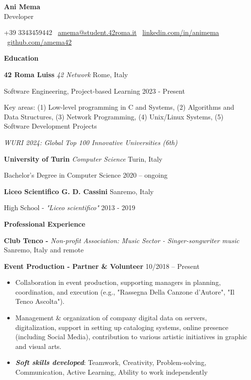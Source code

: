 \documentclass[11pt]{article}
\begin{document}
\begin{center}
    \textbf{Ani Mema}\\ 
    Developer
\end{center}

\begin{center}
    +39 3343459442 \textbullet \ \href{mailto:amema@student.42roma.it}{amema@student.42roma.it} \textbullet \ \href{https://www.linkedin.com/in/animema/}{linkedin.com/in/animema} \textbullet \ \href{https://github.com/amema42}{github.com/amema42}
\end{center}

\begin{center}
    \textbf{Education}
\end{center}
\textbf{42 Roma Luiss} \textit{42 Network} \hfill Rome, Italy

Software Engineering, Project-based Learning \hfill 2023 - Present

Key areas: (1) Low-level programming in C and Systems, (2) Algorithms and Data Structures, (3) Network Programming, (4) Unix/Linux Systems, (5) Software Development Projects

\textit{WURI 2024: Global Top 100 Innovative Universities (6th)
}
\vspace{12pt}

\textbf{University of Turin} \textit{Computer Science} \hfill Turin, Italy

Bachelor's Degree in Computer Science \hfill	2020 – ongoing

\vspace{12pt}

\textbf{Liceo Scientifico G. D. Cassini} \hfill	Sanremo, Italy

High School - \textit{"Liceo scientifico"} \hfill 2013 - 2019

\vspace{12pt}

\begin{center}
    \textbf{Professional Experience}
\end{center}
\textbf{Club Tenco -} \textit{Non-profit Association: Music Sector - Singer-songwriter music} \hfill Sanremo, Italy and remote

\textbf{Event Production - Partner \& Volunteer} \hfill 10/2018 – Present

\begin{itemize}[noitemsep, topsep=0pt, partopsep=0pt, parsep=0pt]
    \item Collaboration in event production, supporting managers in planning, coordination, and execution (e.g., "Rassegna Della Canzone d'Autore", "Il Tenco Ascolta").
    \item Management \& organization of company digital data on servers, digitalization, support in setting up cataloging systems, online presence (including Social Media), contribution to various artistic initiatives in graphic and visual arts.
    \item \textit{\textbf{Soft skills developed}}: Teamwork, Creativity, Problem-solving, Communication, Active Learning, Ability to work independently
\end{itemize}
\end{document}
